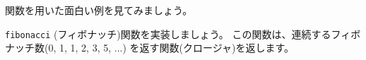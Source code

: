 関数を用いた面白い例を見てみましょう。

\texttt{fibonacci} (フィボナッチ)関数を実装しましょう。
この関数は、連続するフィボナッチ数(0, 1, 1, 2, 3, 5, ...)
を返す関数(クロージャ)を返します。